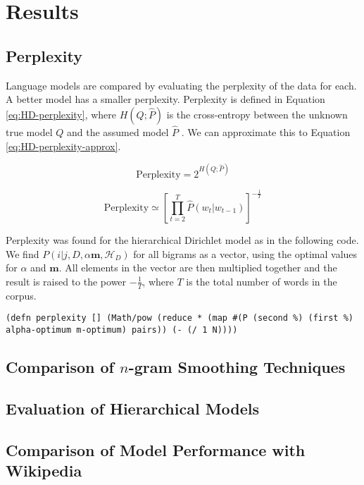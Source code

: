 \chapter{Results}\label{chap:results}

\section{Perplexity}\label{sec:perplexity}

Language models are compared by evaluating the perplexity of the data for each. A better model has a smaller perplexity. Perplexity is defined in Equation \ref{eq:HD-perplexity}, where $H(Q;\hat{P})$ is the cross-entropy between the unknown true model $Q$ and the assumed model $\hat{P}$ \cite{mackay1995hierarchical}. We can approximate this to Equation \ref{eq:HD-perplexity-approx}.

\begin{equation}
\text{Perplexity}=2^{H(Q;\hat{P})}
\label{eq:HD-perplexity}
\end{equation}

\begin{equation}
\text{Perplexity}\simeq\left[\prod_{t=2}^{T}\hat{P}(w_{t}|w_{t-1})\right]^{-\frac{1}{T}}
\label{eq:HD-perplexity-approx}
\end{equation}

Perplexity was found for the hierarchical Dirichlet model as in the following code. We find $P(i|j,D,\alpha\boldsymbol{m},\mathscr{H}_{D})$ for all bigrams as a vector, using the optimal values for $\alpha$ and $\boldsymbol{m}$. All elements in the vector are then multiplied together and the result is raised to the power $-\frac{1}{T}$, where $T$ is the total number of words in the corpus.

\begin{lstlisting}
(defn perplexity [] (Math/pow (reduce * (map #(P (second %) (first %) alpha-optimum m-optimum) pairs)) (- (/ 1 N))))
\end{lstlisting}

\section{Comparison of $n$-gram Smoothing Techniques}


\section{Evaluation of Hierarchical Models}


\section{Comparison of Model Performance with Wikipedia}

